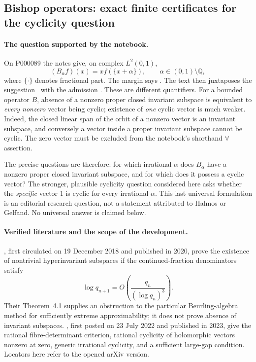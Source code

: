 \subsection{Bishop operators: exact finite certificates for the cyclicity question}
\label{dev:bishop}

\paragraph{The question supported by the notebook.}
On P000089 the notes give, on complex \(L^2(0,1)\),
\[
 (B_\alpha f)(x)=x f(\{x+\alpha\}),\qquad
 \alpha\in(0,1)\setminus\mathbb Q,
\]
where \(\{\cdot\}\) denotes fractional part.  The margin says
.  The text then juxtaposes the suggestion
\ with the admission
.  These are different quantifiers.
For a bounded operator \(B\), absence of a nonzero proper closed invariant
subspace is equivalent to \emph{every nonzero} vector being cyclic; existence
of \emph{one} cyclic vector is much weaker.  Indeed, the closed linear span
of the orbit of a nonzero vector is an invariant subspace, and conversely a
vector inside a proper invariant subspace cannot be cyclic.  The zero vector
must be excluded from the notebook's shorthand \(\forall\) assertion.

The precise questions are therefore: for which irrational \(\alpha\) does
\(B_\alpha\) have a nonzero proper closed invariant subspace, and for which
does it possess a cyclic vector?  The stronger, plausible cyclicity question
considered here asks whether the \emph{specific} vector \(1\) is cyclic for
every irrational \(\alpha\).  This last universal formulation is an editorial
research question, not a statement attributed to Halmos or Gelfand.
No universal answer is claimed below.

\paragraph{Verified literature and the scope of the development.}
\citet[Theorem~3.7]{chamizo2020bishop}, first circulated on 19 December 2018
and published in 2020, prove the existence of nontrivial hyperinvariant
subspaces if the continued-fraction denominators satisfy
\[
 \log q_{n+1}=O\!\left(\frac{q_n}{(\log q_n)^3}\right).
\]
Their Theorem~4.1 supplies an obstruction to the particular Beurling-algebra
method for sufficiently extreme approximability; it does not prove absence
of invariant subspaces.  \citet[Theorems~4.4, 4.5, 4.9, 4.16]{behani2023bishop},
first posted on 23 July 2022 and published in 2023, give the rational
fibre-determinant criterion, rational cyclicity of holomorphic vectors
nonzero at zero, generic irrational cyclicity, and a sufficient large-gap
condition.  Locators here refer to the opened arXiv version.

